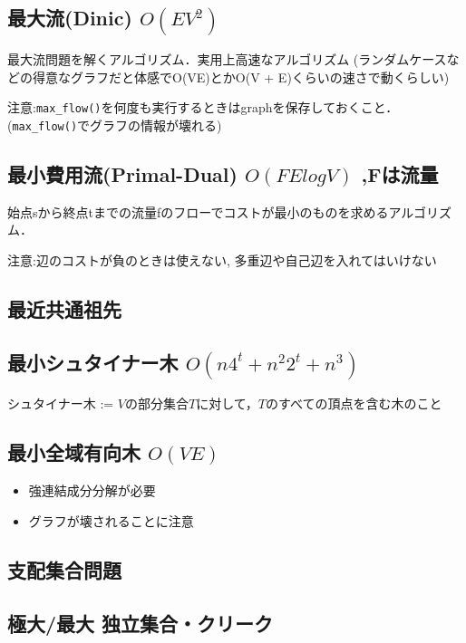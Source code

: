 \documentclass[landscape, twocolumn, 9pt]{jsarticle}
\begin{document}
\subsection{最大流(Dinic) $O(EV^2)$}
最大流問題を解くアルゴリズム．実用上高速なアルゴリズム
(ランダムケースなどの得意なグラフだと体感でO(VE)とかO(V + E)くらいの速さで動くらしい)

 注意:\verb|max_flow()|を何度も実行するときはgraphを保存しておくこと．(\verb|max_flow()|でグラフの情報が壊れる)
 

\subsection{最小費用流(Primal-Dual) $O(F E log V)$ ,Fは流量}
始点sから終点tまでの流量fのフローでコストが最小のものを求めるアルゴリズム．

注意:辺のコストが負のときは使えない, 多重辺や自己辺を入れてはいけない


\subsection{最近共通祖先}


\subsection{最小シュタイナー木 $O(n4^t + n^2 2^t + n^3)$}
シュタイナー木 := $V$の部分集合$T$に対して，$T$のすべての頂点を含む木のこと


\subsection{最小全域有向木 $O(V E)$}
\begin{itemize}
        \item 強連結成分分解が必要
        \item グラフが壊されることに注意
\end{itemize}


\subsection{支配集合問題}


\subsection{極大/最大 独立集合・クリーク}

\end{document}
